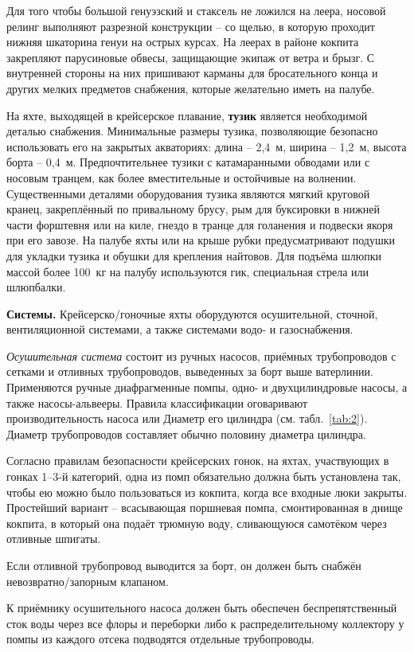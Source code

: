 Для того чтобы большой генуэзский и стаксель не ложился на леера,
носовой релинг выполняют разрезной конструкции \--- со щелью, в
которую проходит нижняя шкаторина генуи на острых курсах. На леерах в
районе кокпита закрепляют парусиновые обвесы, защищающие экипаж от
ветра и брызг. С внутренней стороны на них пришивают карманы для
бросательного конца и других мелких предметов снабжения, которые
желательно иметь на палубе.

На яхте, выходящей в крейсерское плавание, \textbf{тузик}
является необходимой деталью снабжения. Минимальные размеры тузика,
позволяющие безопасно использовать его на закрытых акваториях: длина
\--- 2,4~м, ширина \--- 1,2~м, высота борта \---
0,4~м. Предпочтительнее тузики с катамаранными обводами или с носовым
транцем, как более вместительные и остойчивые на
волнении. Существенными деталями оборудования тузика являются мягкий
круговой кранец, закреплённый по привальному брусу, рым для буксировки
в нижней части форштевня или на киле, гнездо в транце для голанения и
подвески якоря при его завозе. На палубе яхты или на крыше рубки
предусматривают подушки для укладки тузика и обушки для крепления
найтовов. Для подъёма шлюпки массой более 100~кг на палубу
используются гик, специальная стрела или шлюпбалки.

\textbf{Системы.} Крейсерско\-/гоночные яхты оборудуются осушительной,
сточной, вентиляционной системами, а также системами водо- и
газоснабжения.

\textit{Осушительная система} состоит из ручных
насосов, приёмных трубопроводов с сетками и отливных трубопроводов,
выведенных за борт выше ватерлинии. Применяются ручные диафрагменные
помпы, одно- и двухцилиндровые насосы, а также
насосы-альвееры. Правила классификации оговаривают производительность
насоса или Диаметр его цилиндра (см. табл.~\ref{tab:2}). Диаметр
трубопроводов составляет обычно половину диаметра цилиндра.

Согласно правилам безопасности крейсерских гонок, на яхтах,
участвующих в гонках 1--3-й категорий, одна из помп обязательно должна
быть установлена так, чтобы ею можно было пользоваться из кокпита,
когда все входные люки закрыты. Простейший вариант \--- всасывающая
поршневая помпа, смонтированная в днище кокпита, в который она подаёт
трюмную воду, сливающуюся самотёком через отливные шпигаты.

Если отливной трубопровод выводится за борт, он должен быть снабжён
невозвратно\-/запорным клапаном.

К приёмнику осушительного насоса должен быть обеспечен
беспрепятственный сток воды через все флоры и переборки либо к
распределительному коллектору у помпы из каждого отсека подводятся
отдельные трубопроводы.

